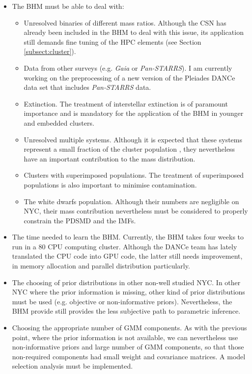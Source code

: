 \begin{itemize}
\item The BHM must be able to deal with:
\begin{itemize}
\item Unresolved binaries of different mass ratios. Although the CSN has already been included in the BHM to deal with this issue, its application still demands fine tuning of the HPC elements (see Section \ref{subsect:cluster}).
\item Data from other surveys (e.g. \emph{Gaia} or \emph{Pan-STARRS}). I am currently working on the preprocessing of a new version of the Pleiades DANCe data set that includes \emph{Pan-STARRS} data.
\item Extinction. The treatment of interstellar extinction is of paramount importance and is mandatory for the application of the BHM in younger and embedded clusters.
\item Unresolved multiple systems. Although it is expected that these systems represent a small fraction of the cluster population \cite[only 4\% for the triple systems][]{Duquennoy1991}, they nevertheless have an important contribution to the mass distribution. 
\item Clusters with superimposed populations. The treatment of superimposed populations is also important to minimise contamination.
\item The white dwarfs population. Although their numbers are negligible on NYC, their mass contribution nevertheless must be considered to properly constrain the PDSMD and the IMFs. 
\end{itemize}
\item The time needed to learn the BHM. Currently, the BHM takes four weeks to run in a 80 CPU computing cluster. Although the DANCe team has lately translated the CPU code into GPU code, the latter still needs improvement, in memory allocation and parallel distribution particularly.
\item The choosing of prior distributions in other non-well studied NYC. In other NYC where the prior information is missing, other kind of prior distributions must be used (e.g. objective or non-informative priors). Nevertheless, the BHM provide still provides the less subjective path to parametric inference.
\item Choosing the appropriate number of GMM components. As with the previous point, where the prior information is not available, we can nevertheless use non-informative priors and large number of GMM components, so that those non-required components had small weight and covariance matrices. A model selection analysis must be implemented.

\end{itemize}
